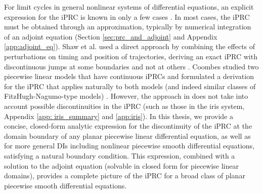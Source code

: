 \documentclass[12pt]{article}
\begin{document}

   
   
For limit cycles in general nonlinear systems of differential equations, an explicit expression for the iPRC is known in only a few cases \cite{BrownMoehlisHolmes:2004:NeComp}. In most cases, the iPRC must be obtained through an approximation, typically by numerical integration of an adjoint equation (Section \ref{sec:prc_and_adjoint} and Appendix \ref{app:adjoint_eq}).  Shaw et al. used a direct approach by combining the effects of perturbations on timing and position of trajectories, deriving an exact iPRC with discontinuous jumps at some boundaries and not at others \cite{ShawParkChielThomas2012SIADS}.  Coombes studied two piecewise linear models that have continuous iPRCs and formulated a derivation for the iPRC that applies naturally to both models (and indeed similar classes of FitzHugh-Nagumo-type models) \cite{Coombes:2008:SIADS}.  However, the approach in \cite{Coombes:2008:SIADS} does not take into account possible discontinuities in the iPRC (such as those in the iris system, Appendix \ref{app:
iris_summary} and \ref{app:iris}).  In 
this thesis, we provide a concise, closed-form analytic expression for the discontinuity of the iPRC at the domain boundary of any planar piecewise linear differential equation, as well as for more general DIs including nonlinear piecewise smooth differential equations, satisfying a natural boundary condition.  This expression, combined with a solution to the adjoint equation (solvable in closed form for piecewise linear domains), provides a complete picture of the iPRC for a broad class of planar piecewise smooth differential equations.
\end{document}
